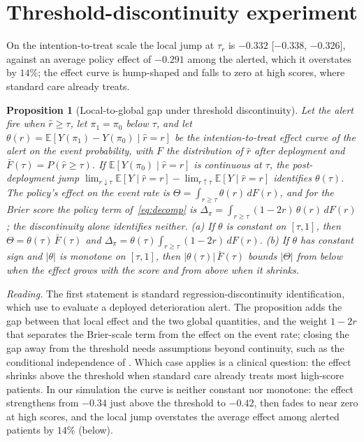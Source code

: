 \documentclass[letterpaper]{article} %
\newtheorem{proposition}{Proposition}
\newcommand{\E}{\mathbb{E}}
\newcommand{\rhat}{\hat r}
\begin{document}
\section{Threshold-discontinuity experiment}
\label{app:rd}
On the intention-to-treat scale the local jump at $\tau_r$ is $-0.332$
[$-0.338$, $-0.326$], against an average policy effect of $-0.291$ among the
alerted, which it overstates by $14\%$; the effect curve is hump-shaped and
falls to zero at high scores, where standard care already treats.

\begin{proposition}[Local-to-global gap under threshold discontinuity]
\label{prop:rd}
Let the alert fire when $\rhat \geq \tau$, let $\pi_1 = \pi_0$ below $\tau$,
and let $\theta(r) = \E[Y(\pi_1) - Y(\pi_0) \mid \rhat = r]$ be the
intention-to-treat effect curve of the alert on the event probability, with
$F$ the distribution of $\rhat$ after deployment and
$\bar F(\tau) = P(\rhat \geq \tau)$. If $\E[Y(\pi_0) \mid \rhat = r]$ is
continuous at $\tau$, the post-deployment jump
$\lim_{r \downarrow \tau} \E[Y \mid \rhat = r] -
\lim_{r \uparrow \tau} \E[Y \mid \rhat = r]$ identifies $\theta(\tau)$. The
policy's effect on the event rate is
$\Theta = \int_{r \geq \tau} \theta(r)\, dF(r)$, and for the Brier score the
policy term of~\eqref{eq:decomp} is
$\Delta_\pi = \int_{r \geq \tau} (1 - 2r)\, \theta(r)\, dF(r)$; the
discontinuity alone identifies neither. (a) If $\theta$ is constant on
$[\tau, 1]$, then $\Theta = \theta(\tau)\, \bar F(\tau)$ and
$\Delta_\pi = \theta(\tau) \int_{r \geq \tau} (1 - 2r)\, dF(r)$. (b) If $\theta$
has constant sign and $|\theta|$ is monotone on $[\tau, 1]$, then
$|\theta(\tau)|\, \bar F(\tau)$ bounds $|\Theta|$ from below when the effect
grows with the score and from above when it shrinks.
\end{proposition}

\noindent\emph{Reading.} The first statement is standard regression-discontinuity
identification, which \citet{gallo2024effectiveness} use to evaluate a deployed
deterioration alert. The proposition adds the gap between that local effect and
the two global quantities, and the weight $1 - 2r$ that separates the
Brier-scale term from the effect on the event rate; closing the gap away from
the threshold needs assumptions beyond continuity, such as the conditional
independence of \citet{angrist2015wanna}. Which case applies is a clinical
question: the effect shrinks above the threshold when standard care already
treats most high-score patients. In our simulation the curve is neither constant nor monotone: the
effect strengthens from $-0.34$ just above the threshold to $-0.42$, then
fades to near zero at high scores, and the local jump overstates the average
effect among alerted patients by $14\%$ (below).
\end{document}

